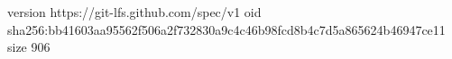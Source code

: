 version https://git-lfs.github.com/spec/v1
oid sha256:bb41603aa95562f506a2f732830a9c4c46b98fcd8b4c7d5a865624b46947ce11
size 906
